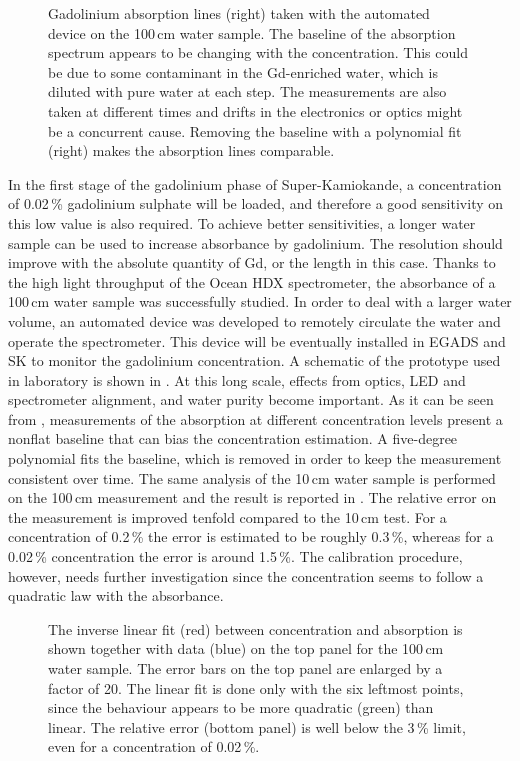 \begin{figure}
	\centering
	\resizebox{\linewidth}{!}{}
	\caption[Gadolinium absorption spectrum of the 100\,cm water sample]%
		{Gadolinium absorption lines (right) taken with the automated device on the 100\,cm water sample.
		The baseline of the absorption spectrum appears to be changing with the concentration.
		This could be due to some contaminant in the Gd-enriched water, which is diluted with pure water %
		at each step.
		The measurements are also taken at different times and drifts in the electronics or optics might be a %
		concurrent cause.
		Removing the baseline with a polynomial fit (right) makes the absorption lines comparable.}
	\label{fig:gad_fit}
\end{figure}

In the first stage of the gadolinium phase of Super-Kamiokande, a concentration of 0.02\,\% gadolinium sulphate %
will be loaded, and therefore a good sensitivity on this low value is also required.
To achieve better sensitivities, a longer water sample can be used to increase absorbance by gadolinium.
The resolution should improve with the absolute quantity of Gd, or the length in this case.
Thanks to the high light throughput of the Ocean HDX spectrometer, %
the absorbance of a 100\,cm water sample was successfully studied.
In order to deal with a larger water volume, an automated device was developed to remotely circulate the water and operate the spectrometer.
This device will be eventually installed in EGADS and SK to monitor the gadolinium concentration.
A schematic of the prototype used in laboratory is shown in .
At this long scale, effects from optics, LED and spectrometer alignment, and water purity become important.
As it can be seen from , measurements of the absorption at different concentration levels %
present a nonflat baseline that can bias the concentration estimation.
A five-degree polynomial fits the baseline, which is removed in order to keep the measurement consistent over time.
The same analysis of the 10\,cm water sample is performed on the 100\,cm measurement and the result is reported in .
The relative error on the measurement is improved tenfold compared to the 10\,cm test.
For a concentration of 0.2\,\% the error is estimated to be roughly 0.3\,\%, %
whereas for a 0.02\,\% concentration the error is around 1.5\,\%.
The calibration procedure, however, needs further investigation since the concentration seems to follow a quadratic law %
with the absorbance.


\begin{figure}
	\centering
	\resizebox{0.9\textwidth}{!}{}
	\caption[Linear fit between Gd concentration and absorption with a 100\,cm water sample]%
		{The inverse linear fit (red) between concentration and absorption %
		is shown together with data (blue) on the top panel for the 100\,cm water sample.
		The error bars on the top panel are enlarged by a factor of 20.
		The linear fit is done only with the six leftmost points, %
		since the behaviour appears to be more quadratic (green) than linear.
		The relative error (bottom panel) is well below the 3\,\% limit, %
		even for a concentration of 0.02\,\%.}
	\label{fig:gad_1m}
\end{figure}
